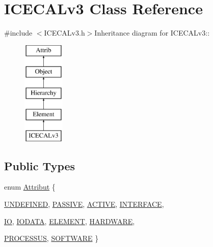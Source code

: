 \hypertarget{classICECALv3}{
\section{ICECALv3 Class Reference}
\label{classICECALv3}
}


{\ttfamily \#include $<$ICECALv3.h$>$}Inheritance diagram for ICECALv3::\begin{figure}[H]
\begin{center}
\leavevmode
\includegraphics[height=5cm]{classICECALv3}
\end{center}
\end{figure}
\subsection*{Public Types}
\begin{DoxyCompactItemize}
\item 
enum \hyperlink{classAttrib_a69e171d7cc6417835a5a306d3c764235}{Attribut} \{ \par
\hyperlink{classAttrib_a69e171d7cc6417835a5a306d3c764235a3a8da2ab97dda18aebab196fe4100531}{UNDEFINED}, 
\hyperlink{classAttrib_a69e171d7cc6417835a5a306d3c764235a2bfb2af57b87031d190a05fe25dd92ed}{PASSIVE}, 
\hyperlink{classAttrib_a69e171d7cc6417835a5a306d3c764235a3b1fec929c0370d1436f2f06e298fb0d}{ACTIVE}, 
\hyperlink{classAttrib_a69e171d7cc6417835a5a306d3c764235aa27c16b480a369ea4d18b07b2516bbc7}{INTERFACE}, 
\par
\hyperlink{classAttrib_a69e171d7cc6417835a5a306d3c764235a1420a5b8c0540b2af210b6975eded7f9}{IO}, 
\hyperlink{classAttrib_a69e171d7cc6417835a5a306d3c764235a0af3b0d0ac323c1704e6c69cf90add28}{IODATA}, 
\hyperlink{classAttrib_a69e171d7cc6417835a5a306d3c764235a7788bc5dd333fd8ce18562b269c9dab1}{ELEMENT}, 
\hyperlink{classAttrib_a69e171d7cc6417835a5a306d3c764235a61ceb22149f365f1780d18f9d1459423}{HARDWARE}, 
\par
\hyperlink{classAttrib_a69e171d7cc6417835a5a306d3c764235a75250e29692496e73effca2c0330977f}{PROCESSUS}, 
\hyperlink{classAttrib_a69e171d7cc6417835a5a306d3c764235a103a67cd0b8f07ef478fa45d4356e27b}{SOFTWARE}
 \}
\end{DoxyCompactItemize}
